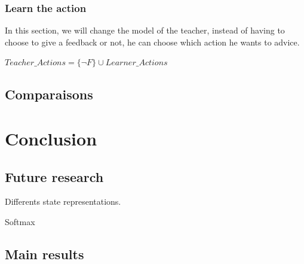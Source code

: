 \documentclass[a4paper,12pt]{article}
\begin{document}
      \subsubsection{Learn the action}
      
      In this section, we will change the model of the teacher, instead of having to choose to give a feedback or not,
      he can choose which action he wants to advice.
      
       $Teacher\_Actions = \{ \neg F\} \cup Learner\_Actions $
     
      
      \subsection{Comparaisons}
      
      
      \section{Conclusion}
      
      \subsection{Future research}
      
      Differents state representations.
      
      Softmax
      
      \subsection{Main results}
      
      
%        
\end{document}

